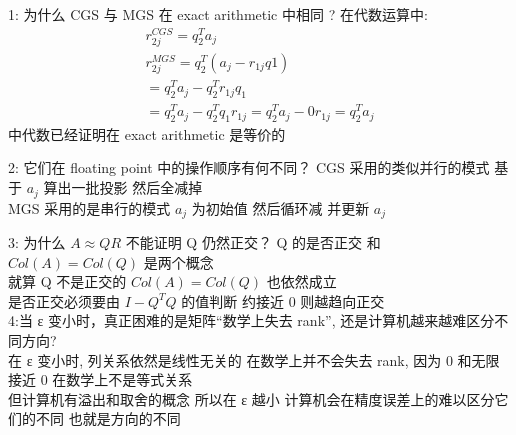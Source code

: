 \documentclass[12pt]{article}
\begin{document}
\begin{flushleft}
    1: 为什么 CGS 与 MGS 在 exact arithmetic 中相同 ?
    在代数运算中: \\
    \begin{align}
        r_{2j}^{CGS} = q_{2}^{T}a_{j}             \\
        r_{2j}^{MGS} = q_{2}^{T}(a_{j}- r_{1j}q1) \\
        = q_{2}^{T}a_{j} - q_{2}^{T}r_{1j}q_{1}   \\
        = q_{2}^{T}a_{j} -  q_{2}^{T}q_{1}r_{1j}
        = q_{2}^{T}a_{j} - 0r_{1j}
        = q_{2}^{T}a_{j}
    \end{align}
    中代数已经证明在 exact arithmetic 是等价的

    2: 它们在 floating point 中的操作顺序有何不同？
    CGS 采用的类似并行的模式 基于 $a_{j}$ 算出一批投影 然后全减掉 \\
    MGS 采用的是串行的模式  $a_{j}$ 为初始值 然后循环减 并更新 $a_{j}$



    3: 为什么 $A≈QR$ 不能证明 Q 仍然正交？
    Q 的是否正交 和 $Col(A) = Col(Q)$ 是两个概念 \\
    就算 Q 不是正交的 $Col(A) = Col(Q)$ 也依然成立 \\
    是否正交必须要由 $ I - Q^{T}Q$ 的值判断 约接近 0 则越趋向正交 \\


    4:当 ε 变小时，真正困难的是矩阵“数学上失去 rank”, 还是计算机越来越难区分不同方向?  \\
    在 ε 变小时, 列关系依然是线性无关的 在数学上并不会失去 rank,  因为 0 和无限接近 0 在数学上不是等式关系 \\
    但计算机有溢出和取舍的概念 所以在 ε 越小 计算机会在精度误差上的难以区分它们的不同 也就是方向的不同


\end{flushleft}
\end{document}
